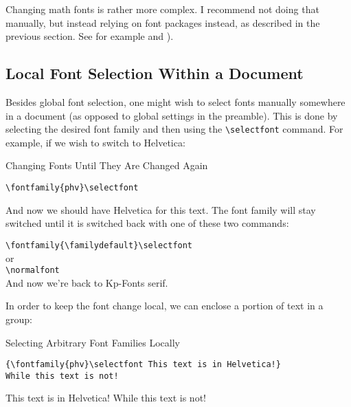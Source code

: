 \documentclass[a4paper,oneside,11pt]{article}
\newcommand\comm[1]{\texttt{\textbackslash#1}}
\begin{document}
Changing  math  fonts is  rather  more  complex. I  recommend not  doing  that
manually,  but  instead  relying  on   font  packages  instead,  as  described
in  the  previous  section. See for  example  \cite{stackexch:math-fonts}  and
\cite{practex:fonts}).


\subsection{Local Font Selection Within a Document}
\label{subsec:fontsel:local}

Besides  global  font selection,  one  might  wish  to select  fonts  manually
somewhere in a document (as opposed  to global settings in the preamble). This
is   done  by   selecting  the   desired  font family  and   then  using   the
\comm{selectfont} command. For example, if we wish to switch to Helvetica:

\begin{titled-frame}
{\textsf{Changing Fonts Until They Are Changed Again}}
\vspace{-1em}
\begin{verbatim}
\fontfamily{phv}\selectfont
\end{verbatim}


\selectfont  And  now  we   should  have  Helvetica  for  this
text. The font family will stay switched until it is switched back with one of
these two commands:

\vspace{1em}\noindent
\verb|\fontfamily{\familydefault}\selectfont|\\[1ex]
or\\[1ex]
\noindent
\verb|\normalfont|\\

\noindent\normalfont And now we're back to Kp-Fonts serif.
\end{titled-frame}

In order to keep the font change local,  we can enclose a portion of text in a
group:

\begin{titled-frame}
{\textsf{Selecting Arbitrary Font Families Locally}}
\vspace{-1em}
\begin{verbatim}
{\fontfamily{phv}\selectfont This text is in Helvetica!}
While this text is not!
\end{verbatim}
{\selectfont This text is in Helvetica!} While this text is not!
\end{titled-frame}
\end{document}
